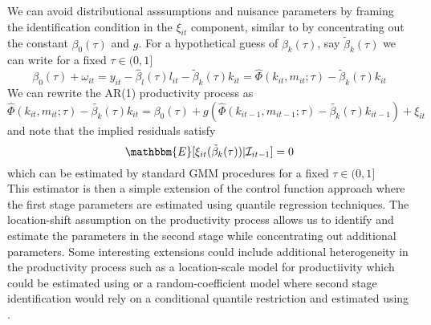 \documentclass[11pt]{article}
\begin{document}
We can avoid distributional asssumptions and nuisance parameters by framing the identification condition in the $\xi_{it}$ component, similar to \cite{Ackerberg2015} by concentrating out the constant $\beta_{0}(\tau)$ and $g$. For a hypothetical guess of $\beta_{k}(\tau)$, say  $\tilde{\beta}_{k}(\tau)$ we can write for a fixed $\tau\in (0,1]$
\begin{equation}
\beta_{0}(\tau)+\omega_{it}=y_{it}-\hat{\beta}_{l}(\tau)l_{it}-\tilde{\beta}_{k}(\tau)k_{it}=\hat{\Phi}(k_{it}, m_{it}; \tau)-\tilde{\beta}_{k}(\tau)k_{it}
\end{equation}
We can rewrite the AR(1) productivity process as
\begin{equation}
\hat{\Phi}(k_{it}, m_{it}; \tau)-\tilde{\beta_{k}}(\tau)k_{it}=\beta_{0}(\tau)+g(\hat{\Phi}(k_{it-1}, m_{it-1}; \tau)-\tilde{\beta_{k}}(\tau)k_{it-1})+\xi_{it}
\end{equation}
and note that the implied residuals satisfy
\begin{equation}
\mathbbm{E}[\xi_{it}(\tilde{\beta}_{k}(\tau))|\mathcal{I}_{it-1}]=0
\end{equation}
which can be estimated by standard GMM procedures for a fixed $\tau\in (0,1]$\\

This estimator is then a simple extension of the control function approach where the first stage parameters are estimated using quantile regression techniques. The location-shift assumption on the productivity process allows us to identify and estimate the parameters in the second stage while concentrating out additional parameters. Some interesting extensions could include additional heterogeneity in the productivity process such as a location-scale model for productiivity which could be estimated using \cite{He1997} or a random-coefficient model where second stage identification would rely on a conditional quantile restriction and estimated using \cite{Kaplan2016}.
\end{document}
